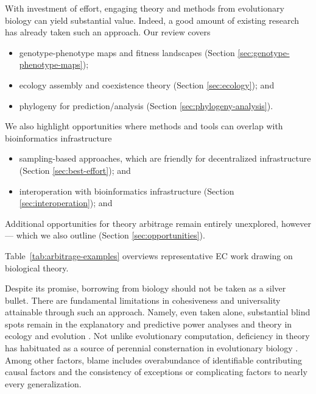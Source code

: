 With investment of effort, engaging theory and methods from evolutionary biology can yield substantial value.
Indeed, a good amount of existing research has already taken such an approach.
Our review covers
\begin{itemize}
  \item genotype-phenotype maps and fitness landscapes (Section \ref{sec:genotype-phenotype-maps});
  \item ecology assembly and coexistence theory (Section \ref{sec:ecology}); and
  \item phylogeny for prediction/analysis (Section \ref{sec:phylogeny-analysis}).
\end{itemize}
We also highlight opportunities where methods and tools can overlap with bioinformatics infrastructure
\begin{itemize}
  \item sampling-based approaches, which are friendly for decentralized infrastructure (Section \ref{sec:best-effort}); and
  \item interoperation with bioinformatics infrastructure (Section \ref{sec:interoperation}); and
\end{itemize}
Additional opportunities for theory arbitrage remain entirely unexplored, however --- which we also outline (Section \ref{sec:opportunities}).

Table~\ref{tab:arbitrage-examples} overviews representative EC work drawing on biological theory.



Despite its promise, borrowing from biology should not be taken as a silver bullet.
There are fundamental limitations in cohesiveness and universality attainable through such an approach.
Namely, even taken alone, substantial blind spots remain in the explanatory and predictive power analyses and theory in ecology and evolution \citep{houlahan2016priority,catford2022addressing,yates2018outstanding}.
Not unlike evolutionary computation, deficiency in theory has habituated as a source of perennial consternation in evolutionary biology \citep{welch2017wrong}.
Among other factors, blame includes overabundance of identifiable contributing causal factors and the consistency of exceptions or complicating factors to nearly every generalization.

